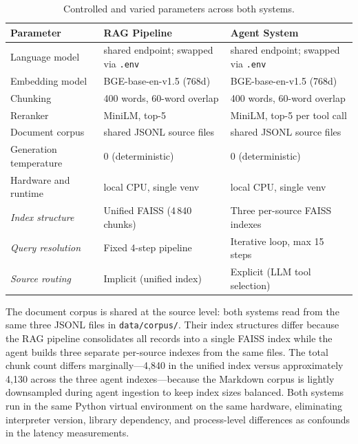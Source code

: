 \begin{table}[ht]
\centering
\small
\setlength{\tabcolsep}{4pt}
\caption{Controlled and varied parameters across both systems.}
\label{tab:comparability}
\begin{tabular}{p{3.8cm}p{5.4cm}p{5.4cm}}
\hline
\textbf{Parameter} & \textbf{RAG Pipeline} & \textbf{Agent System} \\
\hline
Language model        & shared endpoint; swapped via \texttt{.env} & shared endpoint; swapped via \texttt{.env} \\
Embedding model       & BGE-base-en-v1.5 (768d)     & BGE-base-en-v1.5 (768d) \\
Chunking              & 400 words, 60-word overlap  & 400 words, 60-word overlap \\
Reranker              & MiniLM, top-5               & MiniLM, top-5 per tool call \\
Document corpus       & shared JSONL source files   & shared JSONL source files \\
Generation temperature & 0 (deterministic)          & 0 (deterministic) \\
Hardware and runtime  & local CPU, single venv      & local CPU, single venv \\
\hline
\textit{Index structure}  & Unified FAISS (4\,840 chunks) & Three per-source FAISS indexes \\
\textit{Query resolution} & Fixed 4-step pipeline         & Iterative loop, max 15 steps \\
\textit{Source routing}   & Implicit (unified index)      & Explicit (LLM tool selection) \\
\hline
\end{tabular}
\end{table}

The document corpus is shared at the source level: both systems read from the same three JSONL files in \texttt{data/corpus/}. Their index structures differ because the RAG pipeline consolidates all records into a single FAISS index while the agent builds three separate per-source indexes from the same files. The total chunk count differs marginally—4,840 in the unified index versus approximately 4,130 across the three agent indexes—because the Markdown corpus is lightly downsampled during agent ingestion to keep index sizes balanced. Both systems run in the same Python virtual environment on the same hardware, eliminating interpreter version, library dependency, and process-level differences as confounds in the latency measurements.


